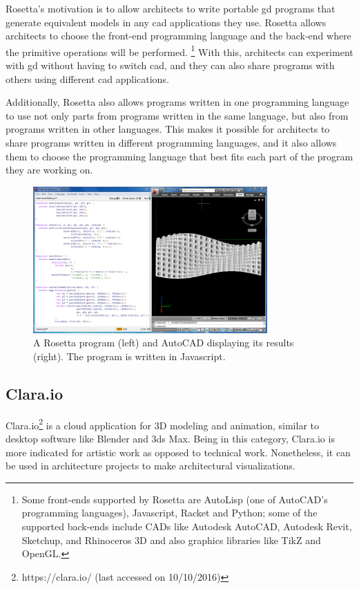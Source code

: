Rosetta's motivation is to allow architects to write portable \gls{gd} programs that generate equivalent models in any \gls{cad} applications they use.
Rosetta allows architects to choose the front-end programming language and the back-end where the primitive operations will be performed\cite{de2012modern}.%
\footnote{Some front-ends supported by Rosetta are AutoLisp (one of AutoCAD's programming languages), Javascript, Racket and Python; some of the supported back-ends include CADs like Autodesk AutoCAD, Autodesk Revit, Sketchup, and Rhinoceros 3D and also graphics libraries like TikZ and OpenGL.}
With this, architects can experiment with \gls{gd} without having to switch \gls{cad}, and they can also share programs with others using different \gls{cad} applications.

Additionally, Rosetta also allows programs written in one programming language to use not only parts from programs written in the same language, but also from programs written in other languages.
This makes it possible for architects to share programs written in different programming languages, and it also allows them to choose the programming language that best fits each part of the program they are working on.

\begin{figure}
	\centering
	\includegraphics[width=0.8\textwidth]{images/rosetta_js_autocad}
	\caption{A Rosetta program (left) and AutoCAD displaying its results (right). The program is written in Javascript.}
	\label{fig:rosetta:ex}
\end{figure}


\subsection{Clara.io}
Clara.io\footnote{https://clara.io/ (last accessed on 10/10/2016)}\cite{houston2013clara} is a cloud application for 3D modeling and animation, similar to desktop software like Blender and 3ds Max.
Being in this category, Clara.io is more indicated for artistic work as opposed to technical work.
Nonetheless, it can be used in architecture projects to make architectural visualizations.

